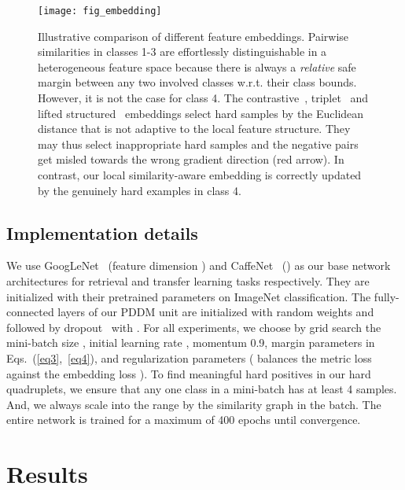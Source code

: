 \documentclass{article}
\begin{document}
\begin{figure}[t]
\begin{center}
\texttt{[image: fig\_embedding]}
\end{center}
\vskip -0.25cm
\caption{Illustrative comparison of different feature embeddings. Pairwise similarities in classes 1-3 are effortlessly distinguishable in a heterogeneous feature space because there is always a \emph{relative} safe margin between any two involved classes w.r.t. their class bounds. However, it is not the case for class 4. The contrastive~\cite{bell15productnet}, triplet~\cite{Schroff2015,Wang2014} and lifted structured~\cite{songCVPR16} embeddings select hard samples by the Euclidean distance that is not adaptive to the local feature structure. They may thus select inappropriate hard samples and the negative pairs get misled towards the wrong gradient direction (red arrow). In contrast, our local similarity-aware embedding is correctly updated by the genuinely hard examples in class 4.}
\label{fig_embedding}
\vspace{-1em}
\end{figure}

\subsection{Implementation details}

We use GoogLeNet~\cite{Szegedy2015} (feature dimension ) and CaffeNet~\cite{KrizhevskyNIPS2012} () as our base network architectures for retrieval and transfer learning tasks respectively. They are initialized with their pretrained parameters on ImageNet classification. The fully-connected layers of our PDDM unit are initialized with random weights and followed by dropout~\cite{JMLRsrivastava14a} with . For all experiments, we choose by grid search the mini-batch size , initial learning rate , momentum 0.9, margin parameters  in Eqs.~(\ref{eq3},~\ref{eq4}), and regularization parameters  ( balances the metric loss  against the embedding loss ). To find meaningful hard positives in our hard quadruplets, we ensure that any one class in a mini-batch has at least 4 samples. And, we always scale  into the range  by the similarity graph in the batch. The entire network is trained for a maximum of 400 epochs until convergence.



\section{Results}
\end{document}
